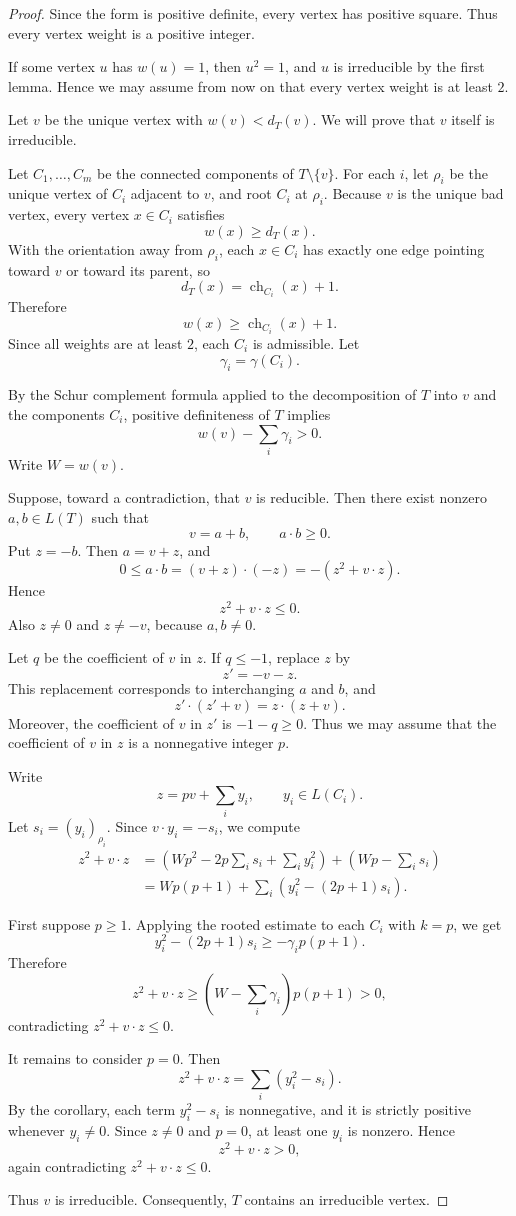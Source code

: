 \documentclass[11pt]{article}
\DeclareMathOperator{\ch}{ch}
\begin{document}
\begin{proof}
Since the form is positive definite, every vertex has positive square. Thus every vertex weight is a positive integer.

If some vertex \(u\) has \(w(u)=1\), then \(u^2=1\), and \(u\) is irreducible by the first lemma. Hence we may assume from now on that every vertex weight is at least \(2\).

Let \(v\) be the unique vertex with \(w(v)<d_T(v)\). We will prove that \(v\) itself is irreducible.

Let \(C_1,\dots,C_m\) be the connected components of \(T\setminus\{v\}\). For each \(i\), let \(\rho_i\) be the unique vertex of \(C_i\) adjacent to \(v\), and root \(C_i\) at \(\rho_i\). Because \(v\) is the unique bad vertex, every vertex \(x\in C_i\) satisfies
\[
w(x)\ge d_T(x).
\]
With the orientation away from \(\rho_i\), each \(x\in C_i\) has exactly one edge pointing toward \(v\) or toward its parent, so
\[
d_T(x)=\ch_{C_i}(x)+1.
\]
Therefore
\[
w(x)\ge \ch_{C_i}(x)+1.
\]
Since all weights are at least \(2\), each \(C_i\) is admissible. Let
\[
\gamma_i=\gamma(C_i).
\]

By the Schur complement formula applied to the decomposition of \(T\) into \(v\) and the components \(C_i\), positive definiteness of \(T\) implies
\[
w(v)-\sum_i\gamma_i>0.
\]
Write \(W=w(v)\).

Suppose, toward a contradiction, that \(v\) is reducible. Then there exist nonzero \(a,b\in L(T)\) such that
\[
v=a+b,
\qquad
a\cdot b\ge 0.
\]
Put \(z=-b\). Then \(a=v+z\), and
\[
0\le a\cdot b=(v+z)\cdot(-z)=-(z^2+v\cdot z).
\]
Hence
\[
z^2+v\cdot z\le 0.
\]
Also \(z\ne 0\) and \(z\ne -v\), because \(a,b\ne 0\).

Let \(q\) be the coefficient of \(v\) in \(z\). If \(q\le -1\), replace \(z\) by
\[
z'=-v-z.
\]
This replacement corresponds to interchanging \(a\) and \(b\), and
\[
z'\cdot(z'+v)=z\cdot(z+v).
\]
Moreover, the coefficient of \(v\) in \(z'\) is \(-1-q\ge 0\). Thus we may assume that the coefficient of \(v\) in \(z\) is a nonnegative integer \(p\).

Write
\[
z=pv+\sum_i y_i,
\qquad y_i\in L(C_i).
\]
Let \(s_i=(y_i)_{\rho_i}\). Since \(v\cdot y_i=-s_i\), we compute
\begin{align*}
z^2+v\cdot z
&=
\left(Wp^2-2p\sum_i s_i+\sum_i y_i^2\right)
+
\left(Wp-\sum_i s_i\right) \\
&=
Wp(p+1)+\sum_i\left(y_i^2-(2p+1)s_i\right).
\end{align*}

First suppose \(p\ge 1\). Applying the rooted estimate to each \(C_i\) with \(k=p\), we get
\[
y_i^2-(2p+1)s_i\ge -\gamma_i p(p+1).
\]
Therefore
\[
z^2+v\cdot z
\ge
\left(W-\sum_i\gamma_i\right)p(p+1)>0,
\]
contradicting \(z^2+v\cdot z\le 0\).

It remains to consider \(p=0\). Then
\[
z^2+v\cdot z
=
\sum_i (y_i^2-s_i).
\]
By the corollary, each term \(y_i^2-s_i\) is nonnegative, and it is strictly positive whenever \(y_i\ne 0\). Since \(z\ne 0\) and \(p=0\), at least one \(y_i\) is nonzero. Hence
\[
z^2+v\cdot z>0,
\]
again contradicting \(z^2+v\cdot z\le 0\).

Thus \(v\) is irreducible. Consequently, \(T\) contains an irreducible vertex.
\end{proof}
\end{document}
